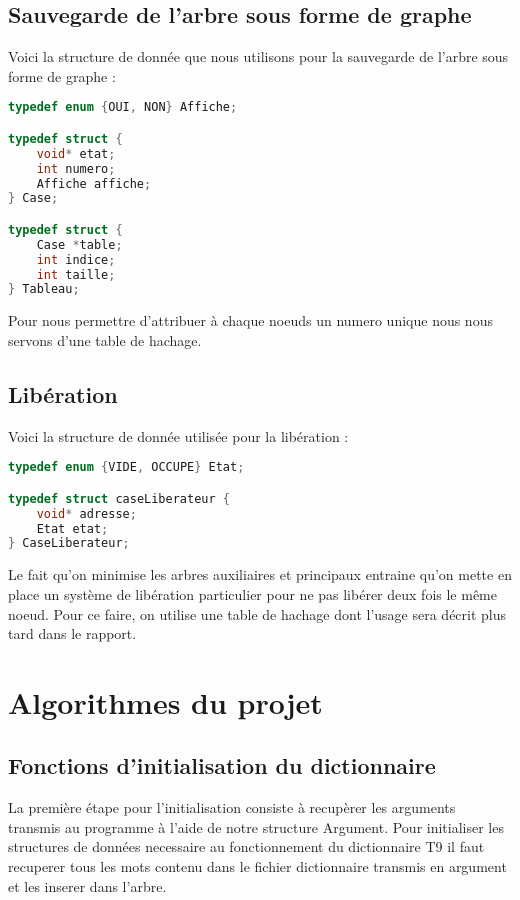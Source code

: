 \documentclass[15pt, a4paper]{article}
\begin{document}
\subsection{Sauvegarde de l'arbre sous forme de graphe}

Voici la structure de donnée que nous utilisons pour la sauvegarde de l'arbre
sous forme de graphe :

\begin{lstlisting}[language=c]
typedef enum {OUI, NON} Affiche;

typedef struct {
    void* etat;
    int numero;
    Affiche affiche;
} Case;

typedef struct {
    Case *table;
    int indice;
    int taille;
} Tableau;
\end{lstlisting}

Pour nous permettre d'attribuer à chaque noeuds un numero unique nous nous servons d'une table
de hachage.

\subsection{Libération}

\noindent Voici la structure de donnée utilisée pour la libération :

\begin{lstlisting}[language=c]
typedef enum {VIDE, OCCUPE} Etat;

typedef struct caseLiberateur {
    void* adresse;
    Etat etat;
} CaseLiberateur;
\end{lstlisting}

Le fait qu'on minimise les arbres auxiliaires et principaux entraine qu'on mette en place
un système de libération particulier pour ne pas libérer deux fois le même noeud. Pour ce
faire, on utilise une table de hachage dont l'usage sera décrit plus tard dans le 
rapport.

\section{Algorithmes du projet}

\subsection{Fonctions d'initialisation du dictionnaire}

La première étape pour l'initialisation consiste à recupèrer les arguments transmis au programme
à l'aide de notre structure Argument.
Pour initialiser les structures de données necessaire au fonctionnement du dictionnaire T9
il faut recuperer tous les mots contenu dans le fichier dictionnaire transmis en argument
et les inserer dans l'arbre.
\end{document}
